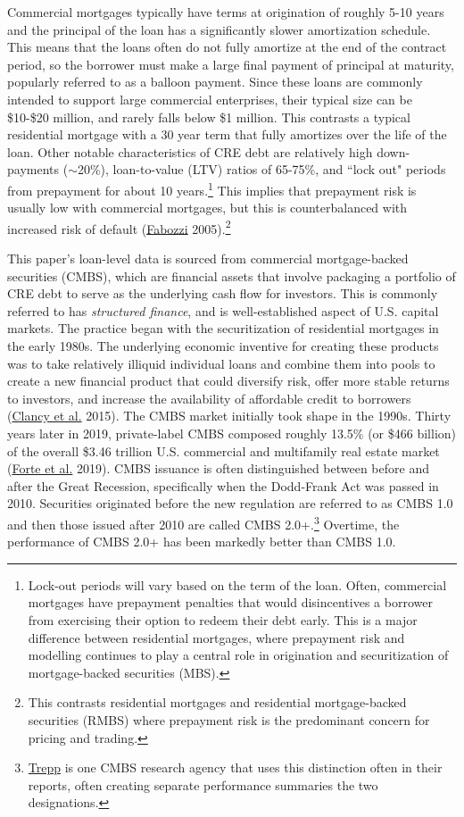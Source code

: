 \documentclass[11pt]{article} %
\begin{document}
Commercial mortgages typically have terms at origination of roughly 5-10 years and the principal of the loan has a significantly slower amortization schedule. This means that the loans often do not fully amortize at the end of the contract period, so the borrower must make a large final payment of principal at maturity, popularly referred to as a balloon payment. Since these loans are commonly intended to support large commercial enterprises, their typical size can be \$10-\$20 million, and rarely falls below \$1 million.  This contrasts a typical residential mortgage with a 30 year term that fully amortizes over the life of the loan. Other notable characteristics of CRE debt are relatively high down-payments ($\sim$20\%), loan-to-value (LTV) ratios of 65-75\%, and ``lock out" periods from prepayment for about 10 years.\footnote{Lock-out periods will vary based on the term of the loan. Often, commercial mortgages have prepayment penalties that would disincentives a borrower from exercising their option to redeem their debt early. This is a major difference between residential mortgages, where prepayment risk and modelling continues to play a central role in origination and securitization of mortgage-backed securities (MBS). } This implies that prepayment risk is usually low with commercial mortgages, but this is counterbalanced with increased risk of default (\hyperlink{Fabozzi}{Fabozzi} 2005).\footnote{This contrasts residential mortgages and residential mortgage-backed securities (RMBS) where prepayment risk is the predominant concern for pricing and trading.}

This paper's loan-level data is sourced from commercial mortgage-backed securities (CMBS), which are financial assets that involve packaging a portfolio of CRE debt to serve as the underlying cash flow for investors. This is commonly referred to has \textit{structured finance}, and is well-established aspect of U.S. capital markets. The practice began with the securitization of residential mortgages in the early 1980s. The underlying economic inventive for creating these products was to take relatively illiquid individual loans and combine them into pools to create a new financial product that could diversify risk, offer more stable returns to investors, and increase the availability of affordable credit to borrowers (\hyperlink{Clancy}{Clancy et al.} 2015). The CMBS market initially took shape in the 1990s. Thirty years later in 2019, private-label CMBS composed roughly 13.5\% (or \$466 billion) of the overall \$3.46 trillion U.S. commercial and multifamily real estate market (\hyperlink{Forte}{Forte et al.} 2019). CMBS issuance is often distinguished between before and after the Great Recession, specifically when the Dodd-Frank Act was passed in 2010. Securities originated before the new regulation are referred to as CMBS 1.0 and then those issued after 2010 are called CMBS 2.0+.\footnote{\href{https://www.trepp.com/}{Trepp} is one CMBS research agency that uses this distinction often in their reports, often creating separate performance summaries the two designations.} Overtime, the performance of CMBS 2.0+ has been markedly better than CMBS 1.0. 
\end{document}
